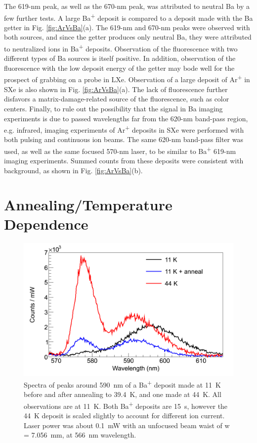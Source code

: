 The 619-nm peak, as well as the 670-nm peak, was attributed to neutral Ba by a few further tests.  A large Ba\textsuperscript{+} deposit is compared to a deposit made with the Ba getter in Fig. \ref{fig:ArVsBa}(a).  The 619-nm and 670-nm peaks were observed with both sources, and since the getter produces only neutral Ba, they were attributed to neutralized ions in Ba\textsuperscript{+} deposits.  Observation of the fluorescence with two different types of Ba sources is itself positive.  In addition, observation of the fluorescence with the low deposit energy of the getter may bode well for the prospect of grabbing on a probe in LXe.  Observation of a large deposit of Ar\textsuperscript{+} in SXe is also shown in Fig. \ref{fig:ArVsBa}(a).  The lack of fluorescence further disfavors a matrix-damage-related source of the fluorescence, such as color centers.  Finally, to rule out the possibility that the signal in Ba imaging experiments is due to passed wavelengths far from the 620-nm band-pass region, e.g. infrared, imaging experiments of Ar\textsuperscript{+} deposits in SXe were performed with both pulsing and continuous ion beams.  The same 620-nm band-pass filter was used, as well as the same focused 570-nm laser, to be similar to Ba\textsuperscript{+} 619-nm imaging experiments.  Summed counts from these deposits were consistent with background, as shown in Fig. \ref{fig:ArVsBa}(b).


\section{Annealing/Temperature Dependence}
\label{sec:tempanneal}



\begin{figure} %
        \centering
                \includegraphics[width=.7\textwidth]{figures/spectra_temperature_conditions.png}
                \caption{Spectra of peaks around 590~nm of a Ba\textsuperscript{+} deposit made at 11~K before and after annealing to 39.4~K, and one made at 44~K.  All observations are at 11~K.  Both Ba\textsuperscript{+} deposits are 15~s, however the 44~K deposit is scaled slightly to account for different ion current.  Laser power was about 0.1~mW with an unfocused beam waist of w = 7.056~mm, at 566~nm wavelength.}
\label{fig:specTempConditions}
\end{figure}

